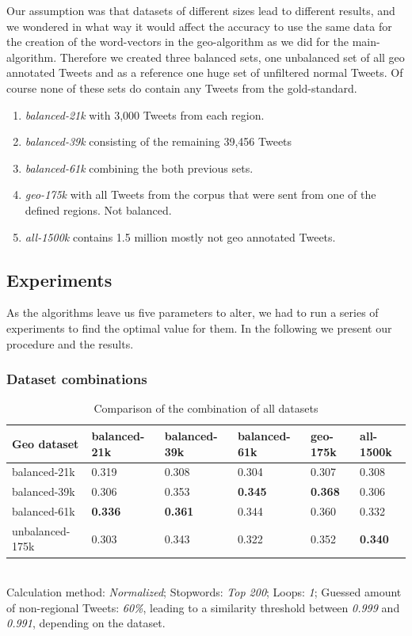 \documentclass[../Main.tex]{subfiles}
\begin{document}
Our assumption was that datasets of different sizes lead to different results, and we wondered in what way it would affect the accuracy to use the same data for the creation of the word-vectors in the geo-algorithm as we did for the main-algorithm. Therefore we created three balanced sets, one unbalanced set of all geo annotated Tweets and as a reference one huge set of unfiltered normal Tweets. Of course none of these sets do contain any Tweets from the gold-standard.
\begin{enumerate}
\item \emph{balanced-21k} with 3,000 Tweets from each region.
\item \emph{balanced-39k} consisting of the remaining 39,456 Tweets
\item \emph{balanced-61k} combining the both previous sets. 
\item \emph{geo-175k} with all Tweets from the corpus that were sent from one of the defined regions. Not balanced.
\item \emph{all-1500k} contains 1.5 million mostly not geo annotated Tweets.
\end{enumerate}
\subsection{Experiments}
As the algorithms leave us five parameters to alter, we had to run a series of experiments to find the optimal value for them. In the following we present our procedure and the results.

\subsubsection{Dataset combinations}
\label{dataset_section}
\begin{table}[b]
    \begin{tabular}{|l|lllll|}
    \hline
    Geo dataset     & balanced-21k & balanced-39k & balanced-61k & geo-175k & all-1500k \\ \hline
    balanced-21k    & 0.319        & 0.308        & 0.304        & 0.307           & 0.308       \\
    balanced-39k    & 0.306        & 0.353       & \textbf{0.345}        & \textbf{0.368 }          & 0.306       \\
    balanced-61k    & \textbf{0.336}        & \textbf{0.361}        & 0.344        &0.360           & 0.332       \\
    unbalanced-175k & 0.303        & 0.343        & 0.322        & 0.352           & \textbf{0.340}       \\ \hline
    \end{tabular} \\

  Calculation method: \textit{Normalized}; Stopwords: \textit{Top 200}; Loops: \textit{1}; Guessed amount of non-regional Tweets: \textit{60\%}, leading to a similarity threshold between \textit{0.999} and \textit{0.991}, depending on the dataset.
  \caption{Comparison of the combination of all datasets}
  \label{geo_datasets}
\end{table}
\end{document}
